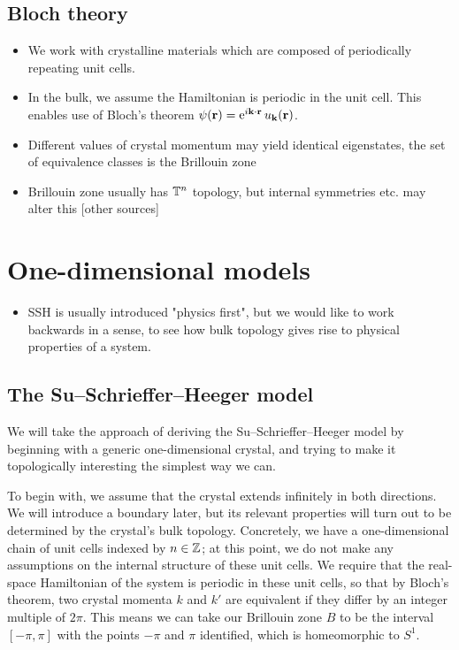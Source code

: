 \subsection{Bloch theory}\label{subsection:bloch}
{\color{blue}
\begin{itemize}
	\item We work with crystalline materials which are composed of periodically repeating unit cells.
	
	\item In the bulk, we assume the Hamiltonian is periodic in the unit cell. This enables use of Bloch's theorem\cite{Bloch_theorem} $\psi(\vb{r}) = \operatorname{e}^{i\vb{k}\cdot\vb{r}}u_{\vb{k}}(\vb{r})$.
	
	\item Different values of crystal momentum may yield identical eigenstates, the set of equivalence classes is the Brillouin zone
	
	\item Brillouin zone usually has $\mathbb{T}^n$ topology, but internal symmetries etc. may alter this\cite{Foncesca-Vaidya_nonorientable} [other sources]
\end{itemize}
}


\section{One-dimensional models}
{\color{blue}
\begin{itemize}
	\item SSH is usually introduced "physics first", but we would like to work backwards in a sense, to see how bulk topology gives rise to physical properties of a system.
\end{itemize}
}

\subsection{The Su--Schrieffer--Heeger model}
We will take the approach of deriving the Su--Schrieffer--Heeger model by beginning with a generic one-dimensional crystal, and trying to make it topologically interesting the simplest way we can.

To begin with, we assume that the crystal extends infinitely in both directions. We will introduce a boundary later, but its relevant properties will turn out to be determined by the crystal's bulk topology. Concretely, we have a one-dimensional chain of unit cells indexed by $n\in\mathbb{Z}$; at this point, we do not make any assumptions on the internal structure of these unit cells. We require that the real-space Hamiltonian of the system is periodic in these unit cells, so that by Bloch's theorem, two crystal momenta $k$ and $k'$ are equivalent if they differ by an integer multiple of $2\pi$. This means we can take our Brillouin zone $B$ to be the interval $[-\pi,\pi]$ with the points $-\pi$ and $\pi$ identified, which is homeomorphic to $S^1$.

